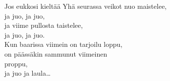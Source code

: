 \begin{song}{Jos eukkosi kieltää}
    Yhä seurassa veikot nuo maistelee,\\
    ja juo, ja juo,\\
    ja viime pullosta taistelee,\\
    ja juo, ja juo.\\
    Kun baarissa viimein on tarjoilu loppu,\\
    on päässäkin sammunut viimeinen\\
    proppu,\\
    ja juo ja laula\dots

\end{song}